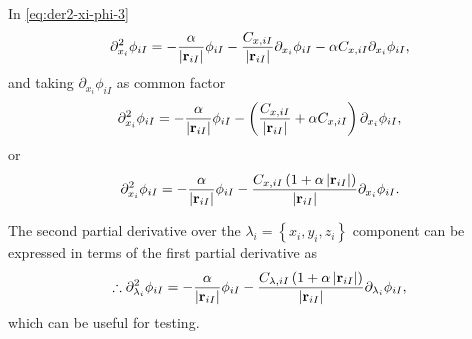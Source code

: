 In \cref{eq:der2-xi-phi-3}
\begin{equation}
    \partial_{x_{i}}^{2} \phi_{iI}
    =
    -
    \frac{
        \alpha
    }{
        \left| \boldsymbol{\mathrm{r}}_{iI} \right|
    }
    \phi_{iI}
    -
    \frac{
        C_{x,iI}
    }{
        \left| \boldsymbol{\mathrm{r}}_{iI} \right|
    }
    \partial_{x_{i}} \phi_{iI}
    - \alpha
    C_{x,iI}
    \partial_{x_i}
    \phi_{iI}
    ,
\end{equation}
and taking $\partial_{x_i} \phi_{iI}$ as common factor
\begin{equation}
    \partial_{x_{i}}^{2} \phi_{iI}
    =
    -
    \frac{
        \alpha
    }{
        \left| \boldsymbol{\mathrm{r}}_{iI} \right|
    }
    \phi_{iI}
    -
    \left( 
        \frac{
            C_{x,iI}
        }{
            \left| \boldsymbol{\mathrm{r}}_{iI} \right|
        }
        +
        \alpha
        C_{x,iI}
    \right)
    \partial_{x_i}
    \phi_{iI}
    ,
\end{equation}
or
\begin{equation}
    \partial_{x_{i}}^{2} \phi_{iI}
    =
    -
    \frac{
        \alpha
    }{
        \left| \boldsymbol{\mathrm{r}}_{iI} \right|
    }
    \phi_{iI}
    -
    \frac{
        C_{x,iI}
        \left( 
            1 + \alpha \left| \boldsymbol{\mathrm{r}}_{iI} \right|
        \right)
    }{
        \left| \boldsymbol{\mathrm{r}}_{iI} \right|
    }
    \partial_{x_i}
    \phi_{iI}
    .
\end{equation}

The second partial derivative over the 
$\lambda_i = \left\{ x_i, y_i, z_i \right\}$
component can be expressed in terms of the first partial derivative as
\begin{equation} \label{eq:partial-2-phi-lambda-first-der}
    \therefore
    \partial_{\lambda_{i}}^{2} \phi_{iI}
    =
    -
    \frac{
        \alpha
    }{
        \left| \boldsymbol{\mathrm{r}}_{iI} \right|
    }
    \phi_{iI}
    -
    \frac{
        C_{\lambda,iI}
        \left( 
            1 + \alpha \left| \boldsymbol{\mathrm{r}}_{iI} \right|
        \right)
    }{
        \left| \boldsymbol{\mathrm{r}}_{iI} \right|
    }
    \partial_{\lambda_i}
    \phi_{iI}
    ,
\end{equation}
which can be useful for testing.

